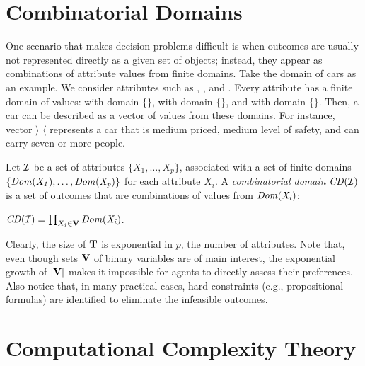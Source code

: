 \section{Combinatorial Domains \label{sec:comb_domains}}
One scenario that makes decision problems difficult is when outcomes
are usually not represented directly as a given set of objects; instead,
they appear as combinations of attribute values from finite domains.
Take the domain of cars as an example.
We consider attributes such as , , and .
Every attribute has a finite domain of values:
 with domain $\{$$\}$,
 with domain $\{$$\}$, and
 with domain $\{$$\}$.
Then, a car can be described as a vector of values from these domains.
For instance, vector $\rangle$  $\langle$ represents
a car that is medium priced, medium level of safety, and can carry seven
or more people.

\begin{definition}
	Let $\mathcal{I}$ be a set of attributes $\{X_1,\ldots,X_p\}$,
	associated with a set of finite domains $\{\it{Dom}(X_1),\ldots,\it{Dom}(X_p)\}$ for each
	attribute $X_i$.
	A \textit{combinatorial domain} $\mathit{CD}(\mathcal{I})$ is a set of outcomes 
	that are combinations of values from $\it{Dom}(X_i)$:
	\begin{center}
		$\mathit{CD}(\mathcal{I}) = \prod_{X_i \in \textbf{V}} \it{Dom}(X_i)$.
	\end{center}
\end{definition}


Clearly, the size of $\textbf{T}$ is exponential in $p$, the number of attributes.
Note that, even though sets $\textbf{V}$ of binary variables are of main interest,
the exponential growth of $|\textbf{V}|$ makes it impossible for agents
to directly assess their preferences.
Also notice that, in many practical cases, hard constraints (e.g., propositional
formulas) are identified to eliminate the infeasible outcomes.



\section{Computational Complexity Theory \label{sec:comp_theory}}

